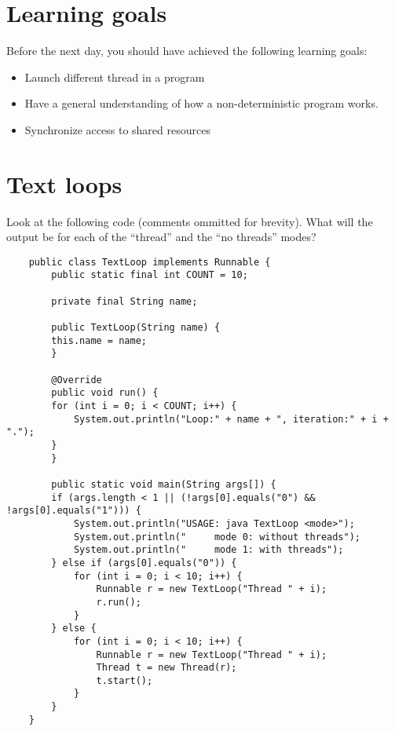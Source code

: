 \documentclass{article}
\begin{document}
\section*{Learning goals}
\label{sec:learning-goals}

Before the next day, you should have achieved the following learning
goals: 

\begin{itemize}
\item Launch different thread in a program
\item Have a general understanding of how a non-deterministic program
  works. 
\item Synchronize access to shared resources
\end{itemize}

\section{Text loops}
\label{sec:text-loops}

Look at the following code (comments ommitted for brevity). What will
the output be for each of the ``thread'' and the ``no threads'' modes? 

\begin{verbatim}
    public class TextLoop implements Runnable {
        public static final int COUNT = 10;
    
        private final String name;
    
        public TextLoop(String name) {
        this.name = name;
        }
    
        @Override
        public void run() {
        for (int i = 0; i < COUNT; i++) {
            System.out.println("Loop:" + name + ", iteration:" + i + ".");
        }
        }
    
        public static void main(String args[]) {
        if (args.length < 1 || (!args[0].equals("0") && !args[0].equals("1"))) {
            System.out.println("USAGE: java TextLoop <mode>");
            System.out.println("     mode 0: without threads");
            System.out.println("     mode 1: with threads");
        } else if (args[0].equals("0")) {
            for (int i = 0; i < 10; i++) {
                Runnable r = new TextLoop("Thread " + i);
                r.run();
            }
        } else {
            for (int i = 0; i < 10; i++) {
                Runnable r = new TextLoop("Thread " + i);
                Thread t = new Thread(r);
                t.start();
            }
        }
    }
\end{verbatim}
\end{document}
